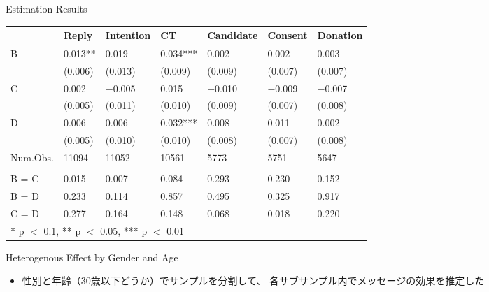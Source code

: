 \documentclass[
      aspectratio=169,
        12pt,
    ]{beamer}
\providecommand{\tightlist}{%
  \setlength{\itemsep}{0pt}\setlength{\parskip}{0pt}}
\begin{document}
\begin{frame}{Estimation Results}
\protect\hypertarget{estimation-results}{}
\begin{table}
\centering
\fontsize{9}{11}\selectfont
\begin{tabular}[t]{l>{\centering\arraybackslash}p{5em}>{\centering\arraybackslash}p{5em}>{\centering\arraybackslash}p{5em}>{\centering\arraybackslash}p{5em}>{\centering\arraybackslash}p{5em}>{\centering\arraybackslash}p{5em}}
\toprule
  & Reply & Intention & CT & Candidate & Consent & Donation\\
\midrule
B & \num{0.013}** & \num{0.019} & \num{0.034}*** & \num{0.002} & \num{0.002} & \num{0.003}\\
 & (\num{0.006}) & (\num{0.013}) & (\num{0.009}) & (\num{0.009}) & (\num{0.007}) & (\num{0.007})\\
C & \num{0.002} & \num{-0.005} & \num{0.015} & \num{-0.010} & \num{-0.009} & \num{-0.007}\\
 & (\num{0.005}) & (\num{0.011}) & (\num{0.010}) & (\num{0.009}) & (\num{0.007}) & (\num{0.008})\\
D & \num{0.006} & \num{0.006} & \num{0.032}*** & \num{0.008} & \num{0.011} & \num{0.002}\\
 & (\num{0.005}) & (\num{0.010}) & (\num{0.010}) & (\num{0.008}) & (\num{0.007}) & (\num{0.008})\\
\midrule
Num.Obs. & \num{11094} & \num{11052} & \num{10561} & \num{5773} & \num{5751} & \num{5647}\\
\addlinespace[0.3em]
\multicolumn{7}{l}{\textit{F-tests, p-value}}\\
\hspace{1em}B = C & \num{0.015} & \num{0.007} & \num{0.084} & \num{0.293} & \num{0.230} & \num{0.152}\\
\hspace{1em}B = D & \num{0.233} & \num{0.114} & \num{0.857} & \num{0.495} & \num{0.325} & \num{0.917}\\
\hspace{1em}C = D & \num{0.277} & \num{0.164} & \num{0.148} & \num{0.068} & \num{0.018} & \num{0.220}\\
\bottomrule
\multicolumn{7}{l}{\rule{0pt}{1em}* p $<$ 0.1, ** p $<$ 0.05, *** p $<$ 0.01}\\
\end{tabular}
\end{table}
\end{frame}

\begin{frame}{Heterogenous Effect by Gender and Age}
\protect\hypertarget{heterogenous-effect-by-gender-and-age}{}
\begin{itemize}
\tightlist
\item
  性別と年齢（30歳以下どうか）でサンプルを分割して、
  各サブサンプル内でメッセージの効果を推定した
\end{itemize}
\end{frame}
\end{document}
